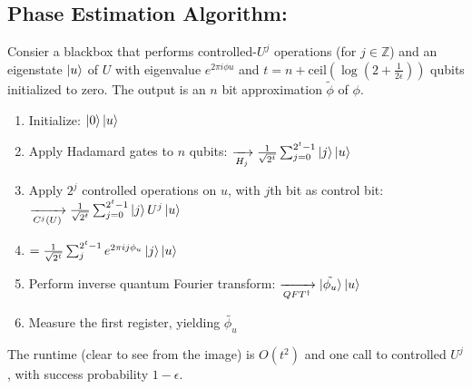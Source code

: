 \documentclass{article}
\begin{document}
\subsection{Phase Estimation Algorithm:}
Consier a blackbox that performs controlled-$U^j$ operations (for $j \in \mathbb{Z}$) and an eigenstate $\ket{u}$ of $U$ with eigenvalue $e^{2\pi i \phi u}$ and $t= n + \text{ceil}(\log(2+\frac{1}{2\epsilon}))$ qubits initialized to zero. The output is an $n$ bit approximation $\tilde{\phi}$ of $\phi$.
\begin{enumerate}
	\item Initialize: $\ket{0}\ket{u}$
	\item Apply Hadamard gates to $n$ qubits: $\xrightarrow[H_j]{} \frac{1}{\sqrt{2^t}} \sum_{j=0}^{2^t-1} \ket{j}\ket{u}$
	\item Apply $2^j$ controlled operations on $u$, with $j$th bit as control bit: $\xrightarrow[C^j(U)]{} \frac{1}{\sqrt{2^t}} \sum_{j=0}^{2^t-1} \ket{j} U^j \ket{u}$
	\item $= \frac{1}{\sqrt{2^t}} \sum^{2^t-1}_{j} e^{2\pi i j \phi_u}\ket{j}\ket{u}$
	\item Perform inverse quantum Fourier transform: $\xrightarrow[QFT^\dag]{} \ket{\tilde{\phi_u}}\ket{u}$
	\item Measure the first register, yielding $\tilde{\phi_u}$
\end{enumerate}
The runtime (clear to see from the image) is $O(t^2)$ and one call to controlled $U^j$, with success probability $1-\epsilon$.
\end{document}
